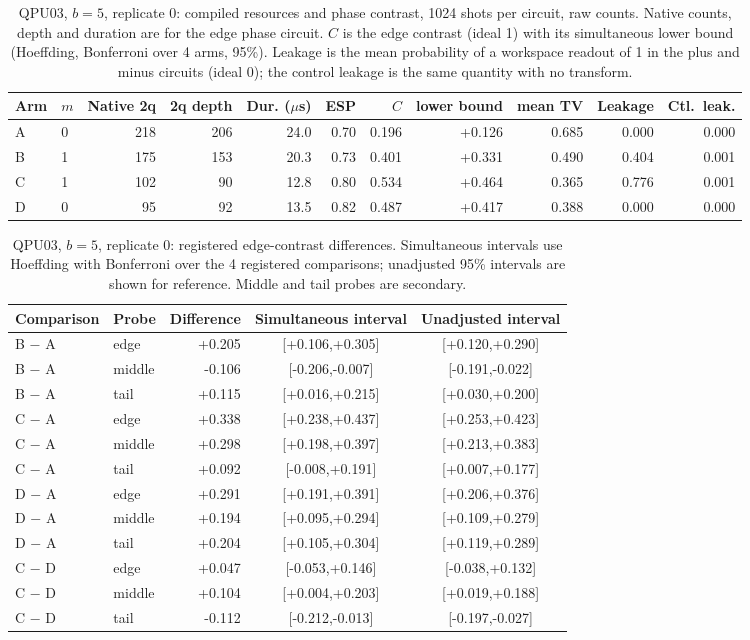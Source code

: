 \begin{table}[htbp]\centering\scriptsize\setlength{\tabcolsep}{3pt}
\caption{QPU03, $b=5$, replicate 0: compiled resources and phase contrast, 1024 shots per circuit, raw counts. Native counts, depth and duration are for the edge phase circuit. $C$ is the edge contrast (ideal 1) with its simultaneous lower bound (Hoeffding, Bonferroni over 4 arms, 95\%). Leakage is the mean probability of a workspace readout of 1 in the plus and minus circuits (ideal 0); the control leakage is the same quantity with no transform.}\label{tab:q3-b5r0}
\begin{tabular}{llrrrrrrrrr}\toprule Arm & $m$ & Native 2q & 2q depth & Dur. ($\mu$s) & ESP & $C$ & lower bound & mean TV & Leakage & Ctl.\ leak.\\\midrule
A & 0 & 218 & 206 & 24.0 & 0.70 & 0.196 & +0.126 & 0.685 & 0.000 & 0.000\\
B & 1 & 175 & 153 & 20.3 & 0.73 & 0.401 & +0.331 & 0.490 & 0.404 & 0.001\\
C & 1 & 102 & 90 & 12.8 & 0.80 & 0.534 & +0.464 & 0.365 & 0.776 & 0.001\\
D & 0 & 95 & 92 & 13.5 & 0.82 & 0.487 & +0.417 & 0.388 & 0.000 & 0.000\\
\bottomrule\end{tabular}\end{table}

\begin{table}[htbp]\centering\scriptsize\setlength{\tabcolsep}{3pt}
\caption{QPU03, $b=5$, replicate 0: registered edge-contrast differences. Simultaneous intervals use Hoeffding with Bonferroni over the 4 registered comparisons; unadjusted 95\% intervals are shown for reference. Middle and tail probes are secondary.}\label{tab:q3d-b5r0}
\begin{tabular}{llrcc}\toprule Comparison & Probe & Difference & Simultaneous interval & Unadjusted interval\\\midrule
B $-$ A & edge & +0.205 & [+0.106,+0.305] & [+0.120,+0.290]\\
B $-$ A & middle & -0.106 & [-0.206,-0.007] & [-0.191,-0.022]\\
B $-$ A & tail & +0.115 & [+0.016,+0.215] & [+0.030,+0.200]\\
C $-$ A & edge & +0.338 & [+0.238,+0.437] & [+0.253,+0.423]\\
C $-$ A & middle & +0.298 & [+0.198,+0.397] & [+0.213,+0.383]\\
C $-$ A & tail & +0.092 & [-0.008,+0.191] & [+0.007,+0.177]\\
D $-$ A & edge & +0.291 & [+0.191,+0.391] & [+0.206,+0.376]\\
D $-$ A & middle & +0.194 & [+0.095,+0.294] & [+0.109,+0.279]\\
D $-$ A & tail & +0.204 & [+0.105,+0.304] & [+0.119,+0.289]\\
C $-$ D & edge & +0.047 & [-0.053,+0.146] & [-0.038,+0.132]\\
C $-$ D & middle & +0.104 & [+0.004,+0.203] & [+0.019,+0.188]\\
C $-$ D & tail & -0.112 & [-0.212,-0.013] & [-0.197,-0.027]\\
\bottomrule\end{tabular}\end{table}

